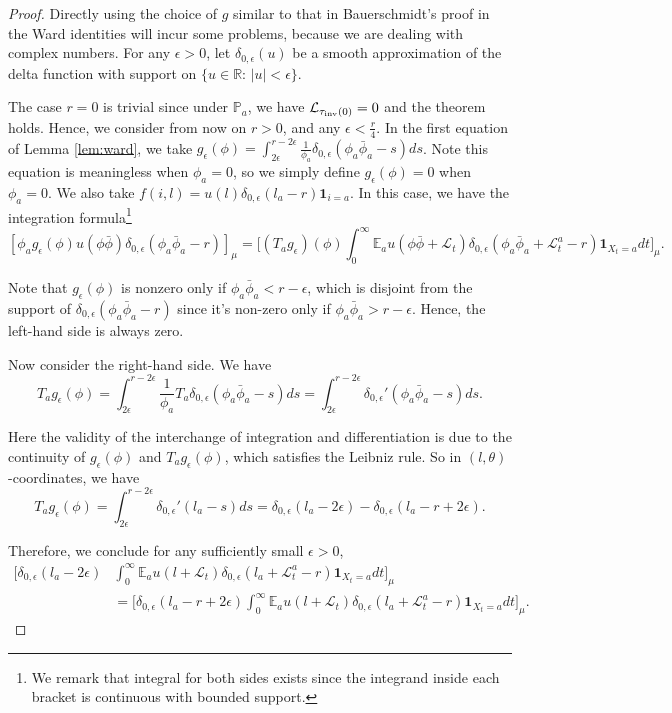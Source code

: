 \documentclass[a4paper, 11pt]{article}
\renewcommand{\P}{\mathbb{P}}
\newcommand{\E}{\mathbb{E}}
\newcommand{\ind}{\mathbf{1}}
\newcommand{\Ell}{\mathcal{L}}
\newcommand{\inv}{\tau_\textnormal{inv}}
\begin{document}
\begin{proof} Directly using the choice of $g$ similar to that in Bauerschmidt's proof\cite{bhs21} in the Ward identities will incur some problems, because we are dealing with complex numbers. For any $\epsilon>0$, let $\delta_{0,\epsilon}(u)$ be a smooth approximation of the delta function with support on $\{u\in \mathbb{R}:\,|u|< \epsilon\}$.

The case $r=0$ is trivial since under $\P_a$, we have $\Ell_{\inv(0)}=0$ and the theorem holds. Hence, we consider from now on $r>0$, and any $\epsilon<\frac{r}{4}$. In the first equation of Lemma \ref{lem:ward}, we take $g_\epsilon(\phi)=\int_{2\epsilon}^{r-2\epsilon}\frac{1}{\phi_a}\delta_{0,\epsilon}(\phi_a\bar{\phi}_a-s)ds$. Note this equation is meaningless when $\phi_a=0$, so we simply define $g_\epsilon(\phi)=0$ when $\phi_a=0$. We also take $f(i,l)=  u(l)\delta_{0,\epsilon}(l_a-r)\ind_{i=a}$. In this case, we have the integration formula\footnote{We remark that integral for both sides exists since the integrand inside each bracket is continuous with bounded support.}
\[[\phi_a g_\epsilon(\phi)  u(\phi\bar{\phi})\delta_{0,\epsilon}(\phi_a\bar{\phi}_a-r)]_\mu=\bigg[(T_ag_\epsilon)(\phi)\int_0^\infty \E_a u(\phi\bar{\phi}+\Ell_t)\delta_{0,\epsilon}( \phi_a\bar{\phi}_a+\Ell_t^a-r)\ind_{X_t=a}dt\bigg]_\mu.\]

Note that $g_\epsilon(\phi)$ is nonzero only if $\phi_a\bar{\phi}_a< r-\epsilon$, which is disjoint from the support of $\delta_{0,\epsilon}(\phi_a\bar{\phi}_a-r)$ since it's non-zero only if $\phi_a\bar{\phi}_a> r-\epsilon$. Hence, the left-hand side is always zero.

Now consider the right-hand side. We have
\[T_ag_\epsilon(\phi)=\int_{2\epsilon}^{r-2\epsilon}\frac{1}{\phi_a}T_a\delta_{0,\epsilon}(\phi_a\bar{\phi}_a-s)ds=\int_{2\epsilon}^{r-2\epsilon}\delta_{0,\epsilon}'(\phi_a\bar{\phi}_a-s)ds.\]

Here the validity of the interchange of integration and differentiation is due to the continuity of $g_\epsilon(\phi)$ and $T_a g_\epsilon(\phi)$, which satisfies the Leibniz rule. So in $(l,\theta)$-coordinates, we have
\[T_ag_\epsilon(\phi)=\int_{2\epsilon}^{r-2\epsilon}\delta_{0,\epsilon}'(l_a-s)ds=\delta_{0,\epsilon}(l_a-2\epsilon)-\delta_{0,\epsilon}(l_a-r+2\epsilon).\]

Therefore, we conclude for any sufficiently small $\epsilon>0$,
\[\begin{aligned}
\bigg[\delta_{0,\epsilon}(l_a-2\epsilon)& \int_0^\infty \E_a u(l+\Ell_t)\delta_{0,\epsilon}( l_a+\Ell_t^a-r)\ind_{X_t=a}dt\bigg]_\mu\\
&=\bigg[\delta_{0,\epsilon}(l_a-r+2\epsilon)\int_0^\infty \E_a u(l+\Ell_t)\delta_{0,\epsilon}( l_a+\Ell_t^a-r)\ind_{X_t=a}dt\bigg]_\mu.\end{aligned}\]


\end{proof}
\end{document}
